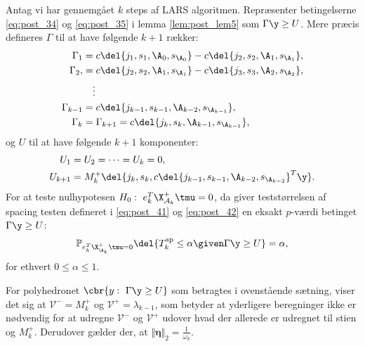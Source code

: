 %
\begin{thm} \label{thm:sp_test}
Antag vi har gennemgået \(k\) steps af LARS algoritmen.
Repræsenter betingelserne \eqref{eq:post_34} og \eqref{eq:post_35} i lemma \ref{lem:post_lem5} som \(\Gamma \y \geq U\).
Mere præcis defineres \(\Gamma\) til at have følgende \(k + 1 \) rækker:
\begin{align*}
\Gamma_1 &= c \del{j_1, s_1, \A_0, s_{\A_0}} - c \del{j_2, s_2, \A_1, s_{\A_1}}, \\
\Gamma_2, &= c \del{j_2, s_2, \A_1, s_{\A_1}} - c \del{j_3, s_3, \A_2, s_{\A_2}}, \\
& \quad \vdots \\
\Gamma_{k-1} &= c \del{j_{k-1}, s_{k-1}, \A_{k-2}, s_{\A_{k-1}}}, \\
 \Gamma_k &= \Gamma_{k+1} = c \del{j_k, s_k, \A_{k-1}, s_{\A_{k-1}}},
\end{align*}
og \(U\) til at have følgende \(k+1\) komponenter:
\begin{align*}
U_1 &= U_2 = \dots = U_k = 0, \\
U_{k+1} &= M_k^+ \del{j_k, s_k, c \del{j_{k-1}, s _{k-1}, \A_{k-2}, s_{\A_{k-2}}}^T \y}.
\end{align*}
For at teste nulhypotesen \(H_0: \ e_k^T \X_{\mathcal{A}_k}^+ \tmu = 0\), da giver teststørrelsen af spacing testen defineret i \eqref{eq:post_41} og \eqref{eq:post_42} en eksakt \(p\)-værdi betinget \(\Gamma \y \geq U\):
\begin{align*}
\mathbb{P}_{e_k^T \X_{\A_k}^+ \tmu = 0} \del{T_k^\text{sp} \leq \alpha \given \Gamma \y \geq U} = \alpha,
\end{align*}
for ethvert \(0 \leq \alpha \leq 1\).
\end{thm}
%
For polyhedronet \(\cbr{y: \ \Gamma \y \geq U}\) som betragtes i ovenstående sætning, viser det sig at \(\mathcal{V}^- = M_k^+\) og \(\mathcal{V}^+=\lambda_{k-1}\), som betyder at yderligere beregninger ikke er nødvendig for at udregne \(\mathcal{V}^-\) og \(\mathcal{V}^+\) udover hvad der allerede er udregnet til stien og \(M_k^+\).
Derudover gælder der, at \(\Vert \boldsymbol{\eta} \Vert_2 = \frac{1}{\omega_k}\).

